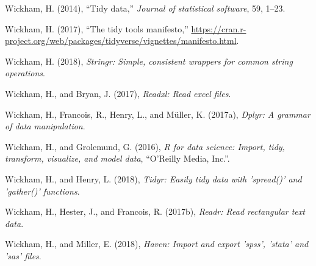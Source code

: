 \documentclass[]{article}
\theoremstyle{definition}
\theoremstyle{definition}
\theoremstyle{definition}
\theoremstyle{remark}
\begin{document}
\leavevmode\hypertarget{ref-Wickham2014}{}%
Wickham, H. (2014), ``Tidy data,'' \emph{Journal of statistical
software}, 59, 1--23.

\leavevmode\hypertarget{ref-Tidyverse-Manifesto}{}%
Wickham, H. (2017), ``The tidy tools manifesto,''
\url{https://cran.r-project.org/web/packages/tidyverse/vignettes/manifesto.html}.

\leavevmode\hypertarget{ref-stringr}{}%
Wickham, H. (2018), \emph{Stringr: Simple, consistent wrappers for
common string operations}.

\leavevmode\hypertarget{ref-readxl}{}%
Wickham, H., and Bryan, J. (2017), \emph{Readxl: Read excel files}.

\leavevmode\hypertarget{ref-dplyr}{}%
Wickham, H., Francois, R., Henry, L., and Müller, K. (2017a),
\emph{Dplyr: A grammar of data manipulation}.

\leavevmode\hypertarget{ref-r4ds}{}%
Wickham, H., and Grolemund, G. (2016), \emph{R for data science: Import,
tidy, transform, visualize, and model data}, ``O'Reilly Media, Inc.''.

\leavevmode\hypertarget{ref-tidyr}{}%
Wickham, H., and Henry, L. (2018), \emph{Tidyr: Easily tidy data with
'spread()' and 'gather()' functions}.

\leavevmode\hypertarget{ref-readr}{}%
Wickham, H., Hester, J., and Francois, R. (2017b), \emph{Readr: Read
rectangular text data}.

\leavevmode\hypertarget{ref-haven}{}%
Wickham, H., and Miller, E. (2018), \emph{Haven: Import and export
'spss', 'stata' and 'sas' files}.
\end{document}
